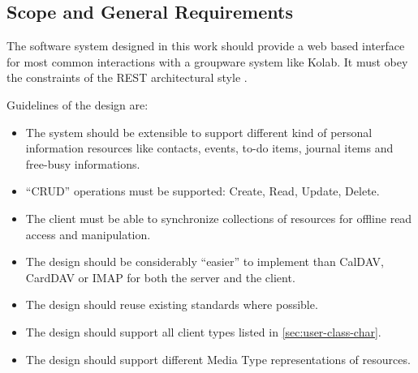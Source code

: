 \documentclass[11pt,a4paper,headsepline,twoside]{scrartcl}		%
\begin{document}
\subsection{Scope and General Requirements}

The software system designed in this work should provide a web based interface
for most common interactions with a groupware system like Kolab. It must obey
the constraints of the REST architectural style \cite{Fielding2000}.

Guidelines of the design are:

\begin{itemize}
\item The system should be extensible to support different kind of personal
  information resources like contacts, events, to-do items, journal items and
  free-busy informations.
  \item ``CRUD'' operations must be supported: Create, Read, Update, Delete.
  \item The client must be able to synchronize collections of resources for
    offline read access and manipulation.
  \item The design should be considerably ``easier'' to implement than CalDAV,
    CardDAV or IMAP for both the server and the client.
  \item The design should reuse existing standards where possible.
  \item The design should support all client types listed in
    \autoref{sec:user-class-char}.
  \item The design should support different Media Type representations of
    resources.
\end{itemize}
\end{document}
